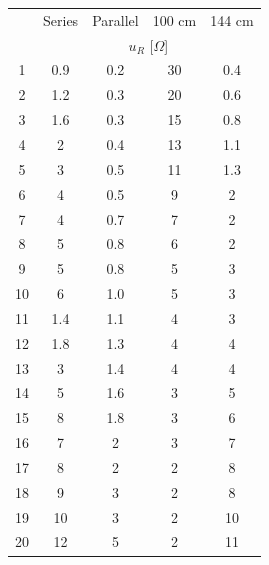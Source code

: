 \documentclass[a4paper]{article}
\begin{document}
\begin{table}[H]\centering
	\begin{tabular}{c|cccc}
		\hline
		   & Series                               & Parallel & 100 cm & 144 cm \\
		   & \multicolumn{4}{c}{$u_R$ [$\Omega$]}                              \\
		\hline
		1  & 0.9                                  & 0.2      & 30     & 0.4    \\
		2  & 1.2                                  & 0.3      & 20     & 0.6    \\
		3  & 1.6                                  & 0.3      & 15     & 0.8    \\
		4  & 2                                    & 0.4      & 13     & 1.1    \\
		5  & 3                                    & 0.5      & 11     & 1.3    \\
		6  & 4                                    & 0.5      & 9      & 2      \\
		7  & 4                                    & 0.7      & 7      & 2      \\
		8  & 5                                    & 0.8      & 6      & 2      \\
		9  & 5                                    & 0.8      & 5      & 3      \\
		10 & 6                                    & 1.0      & 5      & 3      \\
		11 & 1.4                                  & 1.1      & 4      & 3      \\
		12 & 1.8                                  & 1.3      & 4      & 4      \\
		13 & 3                                    & 1.4      & 4      & 4      \\
		14 & 5                                    & 1.6      & 3      & 5      \\
		15 & 8                                    & 1.8      & 3      & 6      \\
		16 & 7                                    & 2        & 3      & 7      \\
		17 & 8                                    & 2        & 2      & 8      \\
		18 & 9                                    & 3        & 2      & 8      \\
		19 & 10                                   & 3        & 2      & 10     \\
		20 & 12                                   & 5        & 2      & 11     \\

\end{tabular}
\end{table}
\end{document}
